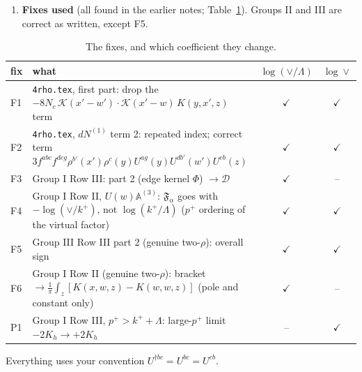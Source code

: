 \documentclass[10pt]{article}
\numberwithin{equation}{section}
\newcommand{\KK}{\mathcal K}
\newcommand{\NO}{\mathcal N_0}
\newcommand{\LL}{L_\Lambda}
\newcommand{\Lk}{L_k}
\newcommand{\J}{\mathcal J}
\newcommand{\B}{\mathcal B}
\newcommand{\ok}{\textcolor{OliveGreen}{\ensuremath{\checkmark}}}
\begin{document}
\begin{enumerate}
\begin{equation}
\boxed{\;\frac{d^3N}{d^3k}\bigg|_{\rm LL}=\NO\Big[\LL\,\J+\Lk\,\big(\B-\J\big)\Big]=\NO\Big[\log\frac{k^+}{\Lambda}\,\J+\log\frac{\vee}{k^+}\,\B\Big].\;}
\label{eq:result}
\end{equation}
\begin{itemize}
\item The target evolves over the rapidity interval below the measured gluon, $\log(k^+/\Lambda)$. The projectile evolves over the interval above it, $\log(\vee/k^+)$. Together these make $\delta Y=\log(\vee/\Lambda)$.
\item In your variables, $\log(\vee/\Lambda)$ multiplies $\J$ alone.
\item The same result can be written so that both evolutions multiply $\delta Y$. The identity is
\begin{equation}
\frac{d^3N}{d^3k}\bigg|_{\rm LL}=\NO\Big[\tfrac12\log\frac{\vee}{\Lambda}\,\big(\J+\B\big)+\tfrac12\log\frac{k^{+2}}{\vee\Lambda}\,\big(\J-\B\big)\Big].
\label{eq:half}
\end{equation}
The second term vanishes only when the measured gluon sits in the middle of the window, $k^+=\sqrt{\vee\Lambda}$. Otherwise it is there, because $\J\ne\B$ (Table~\ref{tab:points}).
\end{itemize}
\item \textbf{Fixes used} (all found in the earlier notes; Table~\ref{tab:fixes}). Groups II and III are correct as written, except F5.
\end{enumerate}

\begin{table}[H]
\centering\small
\begin{tabular}{@{}l >{\raggedright\arraybackslash}p{} c c@{}}
fix & what & $\log(\vee/\Lambda)$ & $\log\vee$\\ \hline
F1 & \texttt{4rho.tex}, first part: drop the $-8N_c\,\KK(x'-w')\cdot\KK(x'-w)\,K(y,x',z)$ term & \ok & \ok\\
F2 & \texttt{4rho.tex}, $dN^{(1)}$ term 2: repeated index; correct term $3f^{abc}f^{deg}\rho^{b'}(x')\rho^c(y)U^{ag}(y)U^{db'}(w')U^{eb}(z)$ & \ok & \ok\\
F3 & Group I Row III: part 2 (edge kernel $\Phi$) $\to\mathcal D$ & \ok & --\\
F4 & Group I Row II, $U(w)\mathbb A^{(3)}$: $\mathfrak F_\alpha$ goes with $-\log(\vee/k^+)$, not $\log(k^+/\Lambda)$ ($p^+$ ordering of the virtual factor) & \ok & \ok\\
F5 & Group III Row III part 2 (genuine two-$\rho$): overall sign & \ok & \ok\\
F6 & Group I Row II (genuine two-$\rho$): bracket $\to\frac1\pi\int_z[K(x,w,z)-K(w,w,z)]$ (pole and constant only) & \ok & --\\
P1 & Group I Row III, $p^+>k^++\Lambda$: large-$p^+$ limit $-2K_h\to+2K_h$ & -- & \ok\\
\end{tabular}
\caption{The fixes, and which coefficient they change.}
\label{tab:fixes}
\end{table}
Everything uses your convention $U^{\dagger bc}=U^{bc}=U^{cb}$.
\end{document}
